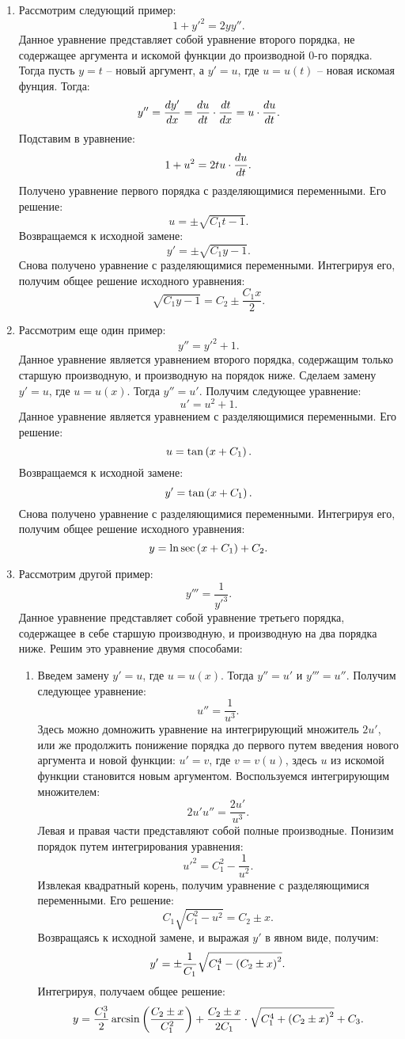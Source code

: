 \begin{enumerate}
			\item Рассмотрим следующий пример:
				\[ 1 + y'^2 = 2yy''. \]
				Данное уравнение представляет собой уравнение второго порядка, не содержащее аргумента и искомой функции до производной $0$-го порядка. Тогда пусть $y = t$ -- новый аргумент, а $y' = u$, где $u = u(t)$ -- новая искомая фунция. Тогда:
				\[ y'' = \dfrac{d y'}{d x} = \dfrac{d u}{d t} \cdot \dfrac{d t}{d x} = u \cdot \dfrac{d u}{d t}. \]
				Подставим в уравнение:
				\[ 1 + u^2 = 2tu \cdot \dfrac{d u}{d t}. \]
				Получено уравнение первого порядка с разделяющимися переменными. Его решение:
				\[ u = \pm \sqrt{C_1 t - 1}. \]
				Возвращаемся к исходной замене:
				\[ y' = \pm \sqrt{C_1 y - 1}. \]
				Снова получено уравнение с разделяющимися переменными. Интегрируя его, получим общее решение исходного уравнения:
				\[ \sqrt{C_1 y - 1} = C_2 \pm \frac{C_1x}{2}. \]

			\item Рассмотрим еще один пример:
				\[ y'' = y'^2 + 1. \]
				Данное уравнение является уравнением второго порядка, содержащим только старшую производную, и производную на порядок ниже. Сделаем замену $y' = u$, где $u = u(x)$. Тогда $y'' = u'$. Получим следующее уравнение:
				\[ u' = u^2 + 1. \]
				Данное уравнение является уравнением с разделяющимися переменными. Его решение:
				\[ u = \tan\left( x + C_1 \right). \]
				Возвращаемся к исходной замене:
				\[ y' = \tan\left( x + C_1 \right). \]
				Снова получено уравнение с разделяющимися переменными. Интегрируя его, получим общее решение исходного уравнения:
				\[ y = \ln{\sec \left( x + C_1 \right) } + C_2. \]
				
			\item Рассмотрим другой пример:
				\[ y''' = \frac{1}{y'^3}. \]
				Данное уравнение представляет собой уравнение третьего порядка, содержащее в себе старшую производную, и производную на два порядка ниже. Решим это уравнение двумя способами:
				\begin{enumerate}
					\item Введем замену $y' = u$, где $u = u(x)$. Тогда $y'' = u'$ и $y''' = u''$. Получим следующее уравнение:
						\[ u'' = \frac{1}{u^3}. \]
						Здесь можно домножить уравнение на интегрирующий множитель $2u'$, или же продолжить понижение порядка до первого путем введения нового аргумента и новой функции: $u' = v$, где $v = v(u)$, здесь $u$ из искомой функции становится новым аргументом. Воспользуемся интегрирующим множителем:
						\[ 2u' u'' = \frac{2u'}{u^3}. \]
						Левая и правая части представляют собой полные производные. Понизим порядок путем интегрирования уравнения:
						\[ u'^2 = C_1^2 - \frac{1}{u^2}. \]
						Извлекая квадратный корень, получим уравнение с разделяющимися переменными. Его решение:
						\[ C_1 \sqrt{C_1^2 - u^2} = C_2 \pm x. \]
						Возвращаясь к исходной замене, и выражая $y'$ в явном виде, получим:
						\[ y' = \pm \frac{1}{C_1} \sqrt{C_1^4 - \left( C_2 \pm x \right)^2}. \]
						Интегрируя, получаем общее решение:
						\[ y = \frac{C_1^3}{2} \arcsin\left( \frac{C_2 \pm x}{C_1^2} \right) + \frac{C_2 \pm x}{2 C_1} \cdot \sqrt{C_1^4 + \left( C_2 \pm x \right)^2} + C_3. \]


\end{enumerate}
\end{enumerate}
